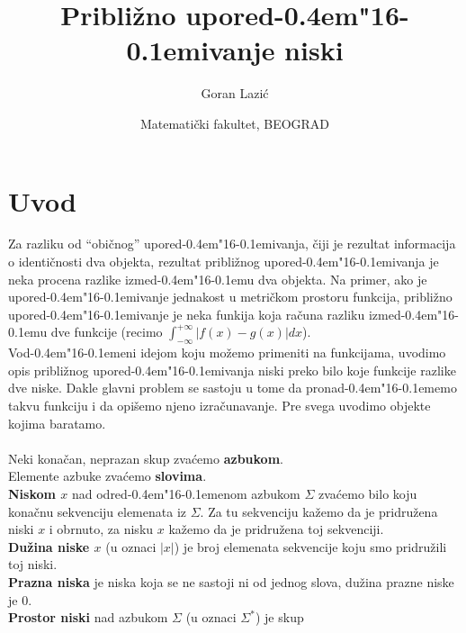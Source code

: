 
  \def\d{d\kern-0.4em\char"16\kern-0.1em}
  \def\hs{\hspace*{1em}}
  \def\s{\hspace*{0.55em}}
  \def\t#1{{\tt #1}}
  \def\x{\^\space}

  \title{Pribli\v{z}no upore{\d}ivanje niski}
  \author{Goran Lazi\'c}
  \date{Matemati\v{c}ki fakultet, BEOGRAD}


%
%
  \maketitle
  \noindent
%
%
  \section{Uvod}
    Za razliku od ``obi\v{c}nog'' upore{\d}ivanja, \v{c}iji je rezultat
    informacija o identi\v{c}nosti dva objekta, rezultat pribli\v{z}nog
    upore{\d}ivanja je neka procena razlike izme{\d}u dva objekta.
    Na primer, ako je upore{\d}ivanje jednakost u metri\v{c}kom prostoru
    funkcija, pribli\v{z}no upore{\d}ivanje je neka funkija koja ra\v{c}una
    razliku izme{\d}u dve funkcije (recimo
    $\int_{-\infty}^{+\infty}|f(x)-g(x)|dx$).\\
    Vo{\d}eni idejom koju mo\v{z}emo primeniti na funkcijama, uvodimo opis
    pribli\v{z}nog upore{\d}ivanja niski preko bilo koje funkcije razlike
    dve niske.
    Dakle glavni problem se sastoju u tome da prona{\d}emo takvu funkciju
    i da opi\v{s}emo njeno izra\v{c}unavanje.
    Pre svega uvodimo objekte kojima baratamo.\\
    \\
    Neki kona\v{c}an, neprazan skup zva\'cemo {\bf azbukom}.\\
    Elemente azbuke zva\'cemo {\bf slovima}.\\
    {\bf Niskom $x$} nad odre{\d}enom azbukom $\Sigma$ zva\'cemo bilo koju
    kona\v{c}nu sekvenciju ele\-menata iz $\Sigma$.
    Za tu sekvenciju ka\v{z}emo da je pridru\v{z}ena niski $x$ i obrnuto,
    za nisku $x$ ka\v{z}emo da je pridru\v{z}ena toj sekvenciji.\\
    {\bf Du\v{z}ina niske $x$} (u oznaci $|x|$) je broj elemenata sekvencije
    koju smo pridru\v{z}ili toj niski.\\
    {\bf Prazna niska} je niska koja se ne sastoji ni od jednog slova,
    du\v{z}ina prazne niske je $0$.\\
    {\bf Prostor niski} nad azbukom $\Sigma$ (u oznaci $\Sigma^*$) je skup

